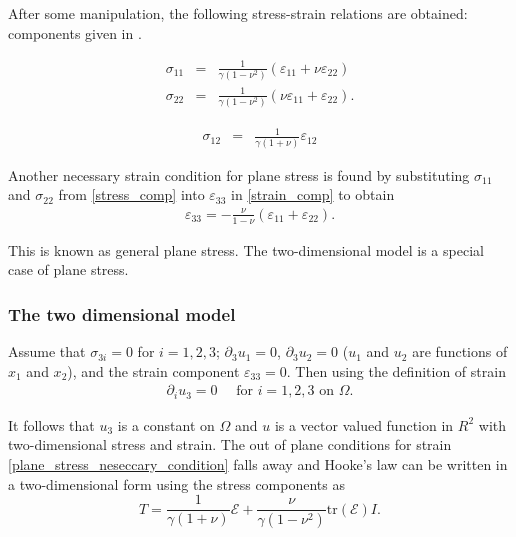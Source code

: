 			After some manipulation, the following stress-strain relations are obtained:
			components given in \cite{Fung65}.

			\begin{minipage}{.5\linewidth}
				\begin{eqnarray*}
					\sigma_{11} & = & \frac{1}{\gamma(1-\nu^2)} ( \varepsilon_{11} + \nu\varepsilon_{22})\\
					\sigma_{22} & = & \frac{1}{\gamma(1-\nu^2)} (\nu \varepsilon_{11} + \varepsilon_{22}).
				\end{eqnarray*}
			\end{minipage}%
			\begin{minipage}{.5\linewidth}
				\begin{eqnarray}
					\sigma_{12} & = & \frac{1}{\gamma(1+\nu)} \varepsilon_{12} \label{stress_comp}
				\end{eqnarray}
			\end{minipage}

			Another necessary strain condition for plane stress is found by substituting
			$\sigma_{11}$ and $\sigma_{22}$ from \eqref{stress_comp} into
			$\varepsilon_{33}$ in \eqref{strain_comp} to obtain
			\begin{eqnarray}
				\varepsilon_{33} = -\frac{\nu}{1-\nu} (\varepsilon_{11} + \varepsilon_{22}).\label{plane_stress_neseccary_condition}
			\end{eqnarray}

			This is known as general plane stress. The two-dimensional model is a special case of plane stress.

		\subsubsection*{The two dimensional model}
			Assume that $\sigma_{3i} = 0$ for $i = 1, 2, 3$; $\partial_3 u_1 = 0$, $\partial_3 u_2 = 0$ ($u_1$ and $u_2$ are functions of $x_1$ and $x_2$), and the strain component $\varepsilon_{33} = 0$. Then using the definition of strain 
			\begin{eqnarray}
				\partial_i u_3 = 0 \quad \textrm{ for } i = 1,2,3 \textrm{ on } \Omega.
			\end{eqnarray}

			It follows that $u_3$ is a constant on $\Omega$ and $u$ is a vector valued function in 
			$R^2$ with two-dimensional stress and strain. The out of plane conditions for strain 
			\eqref{plane_stress_neseccary_condition} falls away and Hooke’s law can be written in a 
			two-dimensional form using the stress components as 
			\[ T = \frac{1}{\gamma(1+\nu)}\mathcal{E} + \frac{\nu}{\gamma(1-\nu^2)}\textrm{tr}(\mathcal{E})I.\]

